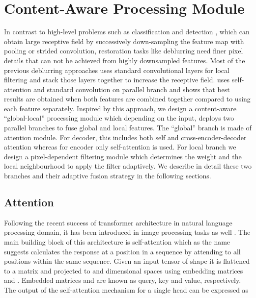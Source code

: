 \documentclass[10pt,twocolumn,letterpaper]{article}
\begin{document}
\section{Content-Aware Processing Module}
In contrast to high-level problems such as classification and detection \cite{wang2018non}, which can obtain large receptive field by successively down-sampling the feature map with pooling or strided convolution, restoration tasks like deblurring need finer pixel details that can not be achieved from highly downsampled features.
Most of the previous deblurring approaches uses standard convolutional layers for local filtering and stack those layers together to increase the receptive field. \cite{bello2019attention} uses self-attention and standard convolution on parallel branch and shows that best results are obtained when both features are combined together compared to using each feature separately. Inspired by this approach, we design a content-aware ``global-local'' processing module which depending on the input, deploys two parallel branches to fuse global and local features. The ``global'' branch is made of attention module. For decoder, this includes both self and cross-encoder-decoder attention whereas for encoder only self-attention is used. For local branch we design a pixel-dependent filtering module which determines the weight and the local neighbourhood to apply the filter adaptively. We describe in detail these two branches and their adaptive fusion strategy in the following sections.
\subsection{Attention}
Following the recent success of transformer architecture \cite{vaswani2017attention} in natural language processing domain, it has been introduced in image processing tasks as well \cite{parmar2018image,liu2018non}. The main building block of this architecture is self-attention which as the name suggests calculates the response at a position in a sequence by attending to all positions within the same sequence. Given an input tensor of shape  it is flattened to a matrix  and projected to  and  dimensional spaces using embedding matrices  and . Embedded matrices  and  are known as query, key and value, respectively. The output of the self-attention mechanism for a single head can be expressed as
\end{document}
